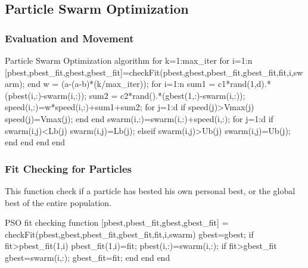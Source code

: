 \subsection{Particle Swarm Optimization}

\subsubsection{Evaluation and Movement}

\begin{mylisting}[enhanced,drop shadow,label={alg:pso}]{Particle Swarm Optimization algorithm}
for k=1:max_iter
  for i=1:n
    [pbest,pbest_fit,gbest,gbest_fit]=checkFit(pbest,gbest,pbest_fit,gbest_fit,fit,i,swarm);
  end
  w = (a-(a-b)*(k/max_iter));
  for i=1:n
    sum1 = c1*rand(1,d).*(pbest(i,:)-swarm(i,:));
    sum2 = c2*rand().*(gbest(1,:)-swarm(i,:));
    speed(i,:)=w*speed(i,:)+sum1+sum2;
    for j=1:d
      if speed(j)>Vmax(j)
        speed(j)=Vmax(j);
      end
    end
    swarm(i,:)=swarm(i,:)+speed(i,:);
    for j=1:d
      if swarm(i,j)<Lb(j)
        swarm(i,j)=Lb(j);
      elseif swarm(i,j)>Ub(j)
        swarm(i,j)=Ub(j);
      end
    end
  end
end
\end{mylisting}

\subsubsection{Fit Checking for Particles}

This function check if a particle has bested his own personal best,
or the global best of the entire population.

\begin{mylisting}[enhanced,drop shadow,label={alg:pso}]{PSO fit checking}
function [pbest,pbest_fit,gbest,gbest_fit] = checkFit(pbest,gbest,pbest_fit,gbest_fit,fit,i,swarm)
  gbest=gbest;
  if fit>pbest_fit(1,i)
    pbest_fit(1,i)=fit;
    pbest(i,:)=swarm(i,:);
    if fit>gbest_fit
      gbest=swarm(i,:);
      gbest_fit=fit;
    end
  end
end
\end{mylisting}





